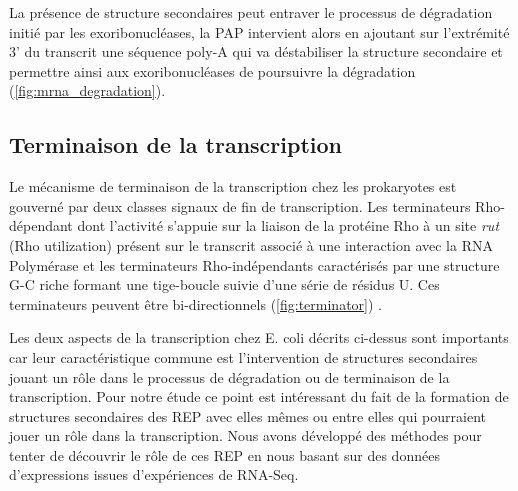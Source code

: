 \documentclass[12pt,a4paper]{report}
\begin{document}
\begin{onehalfspace}
La présence de structure secondaires peut entraver le processus de dégradation initié par les exoribonucléases, la PAP intervient alors en ajoutant sur l'extrémité 3' du transcrit une séquence poly-A qui va déstabiliser la structure secondaire et permettre ainsi aux exoribonucléases de poursuivre la dégradation (\autoref{fig:mrna_degradation}).

\subsection*{Terminaison de la transcription}
Le mécanisme de terminaison de la transcription chez les prokaryotes est gouverné par deux classes signaux de fin de transcription. Les terminateurs Rho-dépendant dont l'activité s'appuie sur la liaison de la protéine Rho à un site \emph{rut} (Rho utilization) présent sur le transcrit associé à une interaction avec la RNA Polymérase et les terminateurs Rho-indépendants caractérisés par une structure G-C riche formant une tige-boucle suivie d'une série de résidus U. Ces terminateurs peuvent être bi-directionnels (\autoref{fig:terminator}) \citep{Henkin2000,Lesnik2001}.  

\begin{figure}
\end{figure}


\vspace{5cm}Les deux aspects de la transcription chez E. coli décrits ci-dessus sont importants car leur caractéristique commune est l'intervention de structures secondaires jouant un rôle dans le processus de dégradation ou de terminaison de la transcription. Pour notre étude ce point est intéressant du fait de la formation de structures secondaires des REP avec elles mêmes ou entre elles qui pourraient jouer un rôle dans la transcription. Nous avons développé des méthodes pour tenter de découvrir le rôle de ces REP en nous basant sur des données d'expressions issues d'expériences de RNA-Seq. 


\end{onehalfspace}
\end{document}

